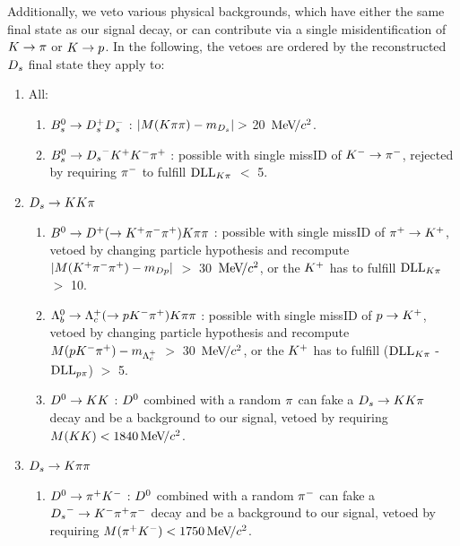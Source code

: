 Additionally, we veto various physical backgrounds, which have either the same final state as our signal decay, or can contribute via a single misidentification of $\kaon\to\pion$ or $\kaon\to\proton$. 
In the following, the vetoes are ordered by the reconstructed $\Ds$ final state they apply to: 


\begin{enumerate}

\item All:

\begin{enumerate}

\item $\Bs\to\Dsp\Dsm$ : $|M(\kaon\pion\pion) - m_{\Ds}| >$ 20 $\mevcc$.

\item $\Bs\to\Ds^{-}\Kp\Km\pip$ : possible with single missID of $\Km\rightarrow\pim$, rejected by requiring $\pim$ to fulfill $\dllkpi$ $<$ 5. 

\end{enumerate}

\item $\Ds\to\kaon\kaon\pion$

\begin{enumerate}

\item $\Bz\to\Dp(\to\Kp\pim\pip)\kaon\pion\pion$ : possible with single missID of $\pip\rightarrow\Kp$, vetoed by changing particle hypothesis and recompute $|M(\Kp\pim\pip) - m_{Dp}|$ $>$ 30 $\mevcc$, 
or the $\Kp$ has to fulfill $\dllkpi$ $>$ 10.

\item $\Lb\to\Lc(\to\proton\Km\pip)\kaon\pion\pion$ : possible with single missID of $\proton\rightarrow\Kp$, vetoed by changing particle hypothesis and recompute $M(\proton\Km\pip) - m_{\Lc}$ $>$ 30 $\mevcc$, 
or the $\Kp$ has to fulfill ($\dllkpi$ - $\dllppi$) $>$ 5.

\item $\Dz\to\kaon\kaon$ : $\Dz$ combined with a random $\pion$ can fake a $\Ds\to\kaon\kaon\pion$ decay and be a background to our signal, vetoed by requiring $M(\kaon\kaon) < 1840 \mevcc$. 

\end{enumerate}

\item $\Ds\to\kaon\pion\pion$

\begin{enumerate}

\item $\Dz\to\pip\Km$ : $\Dz$ combined with a random $\pim$ can fake a $\Ds^{-}\to\Km\pip\pim$ decay and be a background to our signal, vetoed by requiring $M(\pip\Km) < 1750 \mevcc$.


\end{enumerate}
\end{enumerate}
